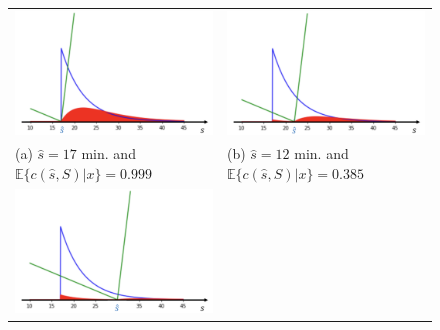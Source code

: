 \begin{solution}
\begin{itemize}
\begin{figure}[!t]
\begin{tabular}{m{}m{}}
\includegraphics[scale=.3]{Figures/Fig_MC1_13.png}&
\includegraphics[scale=.3]{Figures/Fig_MC1_14.png}\\
(a) $\hat{s} = 17$ min. and  $ \mathbb{E}\{c(\hat{s},S)|x\} = 0.999$  &
(b) $\hat{s} = 12$ min. and $ \mathbb{E}\{c(\hat{s},S)|x\} = 0.385 $ \\
\includegraphics[scale=.3]{Figures/Fig_MC1_15.png}&

\end{tabular}
\end{figure}
\end{itemize}
\end{solution}
